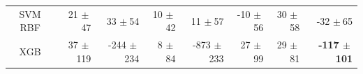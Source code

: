 \begin{table}[htb]
\begin{tabular}{crrrrrrr}
\gls{SVM} RBF      & 21 $\pm~$47                                         & 33 $\pm~$54                 & 10 $\pm~$42                                         & 11 $\pm~$57               & -10 $\pm~$56                                           & 30 $\pm~$58                                              & -32 $\pm~$65                                                \\
XGB     & 37 $\pm~$119                                         & -244 $\pm~$234               & 8 $\pm~$84                                          & -873 $\pm~$233              & 27 $\pm~$99                                           & 29 $\pm~$81                                              & \textbf{-117 $\pm~$101}   \\ \hline
\end{tabular}

\end{table}

